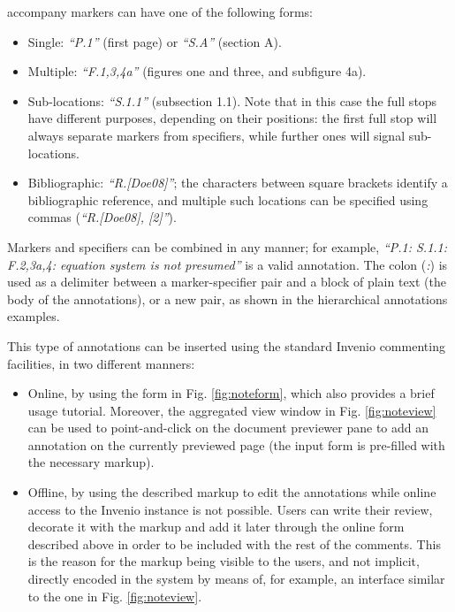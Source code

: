 accompany markers can have one of the following forms:
\begin{itemize}
  \item Single: \textit{``P.1''} (first page) or \textit{``S.A''} (section A).
  \item Multiple: \textit{``F.1,3,4a''} (figures one and three, and subfigure 4a).
  \item Sub-locations: \textit{``S.1.1''} (subsection 1.1). Note that in this
                       case the full stops have different purposes, depending on
                       their positions: the first full stop will always separate
                       markers from specifiers, while further ones will signal
                       sub-locations.
  \item Bibliographic: \textit{``R.[Doe08]''}; the characters between square
                       brackets identify a bibliographic reference, and multiple
                       such locations can be specified using commas
                       (\textit{``R.[Doe08], [2]''}).
\end{itemize}

Markers and specifiers can be combined in any manner; for example,
\textit{``P.1: S.1.1: F.2,3a,4: equation system is not presumed''} is a valid
annotation.  The colon (\textit{:}) is used as a delimiter between a
marker-specifier pair and a block of plain text (the body of the annotations),
or a new pair, as shown in the hierarchical annotations examples.

This type of annotations can be inserted using the standard Invenio
commenting facilities, in two different manners:

\begin{itemize}
  \item Online, by using the form in Fig. \ref{fig:noteform}, which also
        provides a brief usage tutorial. Moreover, the aggregated view window in
        Fig. \ref{fig:noteview} can be used to point-and-click on the document
        previewer pane to add an annotation on the currently previewed page (the
        input form is pre-filled with the necessary markup).
  \item Offline, by using the described markup to edit the annotations while
        online access to the Invenio instance is not possible. Users can write
        their review, decorate it with the markup and add it later through the
        online form described above in order to be included with the rest of the
        comments. This is the reason for the markup being visible to the users,
        and not implicit, directly encoded in the system by means of, for
        example, an interface similar to the one in Fig. \ref{fig:noteview}.
\end{itemize}

